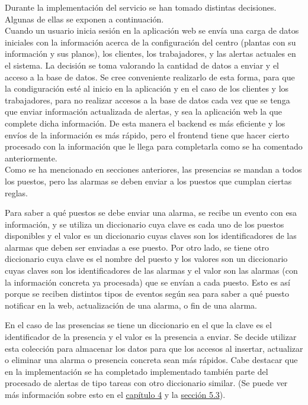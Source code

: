 Durante la implementación del servicio se han tomado distintas decisiones. Algunas de ellas se exponen a continuación.\\

Cuando un usuario inicia sesión en la aplicación web se envía una carga de datos iniciales con la información acerca de la configuración del centro (plantas con su información y sus planos), los clientes, los trabajadores, y las alertas actuales en el sistema. La decisión se toma valorando la cantidad de datos a enviar y el acceso a la base de datos. Se cree conveniente realizarlo de esta forma, para que la condiguración esté al inicio en la aplicación y en el caso de los clientes y los trabajadores, para no realizar accesos a la base de datos cada vez que se tenga que enviar información actualizada de alertas, y sea la aplicación web la que complete dicha información. De esta manera el backend es más eficiente y los envíos de la información es más rápido, pero el frontend tiene que hacer cierto procesado con la información que le llega para completarla como se ha comentado anteriormente.\\

Como se ha mencionado en secciones anteriores, las presencias se mandan a todos los puestos, pero las alarmas se deben enviar a los puestos que cumplan ciertas reglas.

Para saber a qué puestos se debe enviar una alarma, se recibe un evento con esa información, y se utiliza un diccionario cuya clave es cada uno de los puestos disponibles y el valor es un diccionario cuyas claves son los identificadores de las alarmas que deben ser enviadas a ese puesto. Por otro lado, se tiene otro diccionario cuya clave es el nombre del puesto y los valores son un diccionario cuyas claves son los identificadores de las alarmas y el valor son las alarmas (con la información concreta ya procesada) que se envían a cada puesto. Esto es así porque se reciben distintos tipos de eventos según sea para saber a qué puesto notificar en la web, actualización de una alarma, o fin de una alarma.

En el caso de las presencias se tiene un diccionario en el que la clave es el identificador de la presencia y el valor es la presencia a enviar.
Se decide utilizar esta colección para almacenar los datos para que los accesos al insertar, actualizar o eliminar una alarma o presencia concreta sean más rápidos.
Cabe destacar que en la implementación se ha completado implementado también parte del procesado de alertas de tipo tareas con otro diccionario similar. (Se puede ver más información sobre esto en el \hyperref[section-gestion-proyecto]{capítulo 4} y la \hyperref[section-trabajo-futuro]{sección 5.3}).\\

